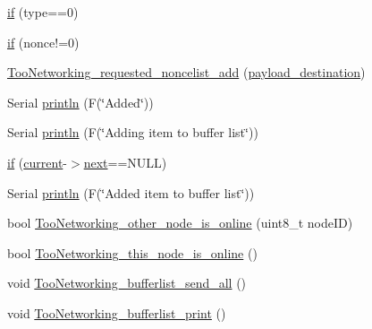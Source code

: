 \begin{DoxyCompactItemize}
\item 
\hyperlink{group__TOONETWORKING__SIMPLE__BUFFER_gaf03e7287c6f8fcd712db428ea10ca2f2}{if} (type==0)
\item 
\hyperlink{group__TOONETWORKING__SIMPLE__BUFFER_gaaf318681cf7c6b13563cc7b4c1dea447}{if} (nonce!=0)
\item 
\hyperlink{group__TOONETWORKING__SIMPLE__BUFFER_gaf4ef0c13c26288a0ff2b63ebee26c99d}{Too\+Networking\+\_\+requested\+\_\+noncelist\+\_\+add} (\hyperlink{group__TOONETWORKING__SIMPLE__BUFFER_ga76db772dc25d4b2f5eb800e93ca3fd0b}{payload\+\_\+destination})
\item 
Serial \hyperlink{group__TOONETWORKING__SIMPLE__BUFFER_gad723079a3b6e374adda415cef80a1f49}{println} (F(\char`\"{}Added\char`\"{}))
\item 
Serial \hyperlink{group__TOONETWORKING__SIMPLE__BUFFER_ga0b4c5929e97949cacfeeef70ec1e08b8}{println} (F(\char`\"{}Adding item to buffer list\char`\"{}))
\item 
\hyperlink{group__TOONETWORKING__SIMPLE__BUFFER_gab2dffc70527ea7fec99a282b41e2ba0f}{if} (\hyperlink{group__TOONETWORKING__SIMPLE__BUFFER_gae8b515cceb310a575b6c2677ba93ea7e}{current}-\/$>$\hyperlink{group__TOONETWORKING__SIMPLE__BUFFER_gaa775cb983053439822fe541f3fa9166a}{next}==N\+U\+LL)
\item 
Serial \hyperlink{group__TOONETWORKING__SIMPLE__BUFFER_ga00890a1640039d4f6a925b290994a004}{println} (F(\char`\"{}Added item to buffer list\char`\"{}))
\item 
bool \hyperlink{group__TOONETWORKING__SIMPLE__BUFFER_gaf4808c2c0857cde9a6721ad54f5ab42d}{Too\+Networking\+\_\+other\+\_\+node\+\_\+is\+\_\+online} (uint8\+\_\+t node\+ID)
\item 
bool \hyperlink{group__TOONETWORKING__SIMPLE__BUFFER_gaa7771141375a0a88ce46bb99ab56ee51}{Too\+Networking\+\_\+this\+\_\+node\+\_\+is\+\_\+online} ()
\item 
void \hyperlink{group__TOONETWORKING__SIMPLE__BUFFER_gab58e06e0eb6f2f8ecbebeaf3c173fb22}{Too\+Networking\+\_\+bufferlist\+\_\+send\+\_\+all} ()
\item 
void \hyperlink{group__TOONETWORKING__SIMPLE__BUFFER_ga2b5485b317146ce7c14bbad26172d796}{Too\+Networking\+\_\+bufferlist\+\_\+print} ()
\end{DoxyCompactItemize}

